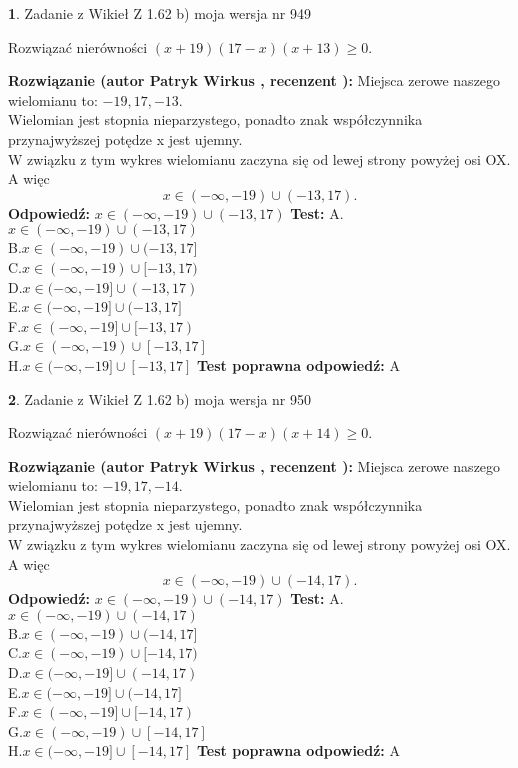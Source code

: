 \documentclass[12pt, a4paper]{article}
\theoremstyle{definition} %
\newtheorem{zad}{}
\newcommand{\zadStart}[1]{\begin{zad}#1\newline}
\newcommand{\zadStop}{\end{zad}}
\newcommand{\rozwStart}[2]{\noindent \textbf{Rozwiązanie (autor #1 , recenzent #2): }\newline}
\newcommand{\rozwStop}{\newline}
\newcommand{\odpStart}{\noindent \textbf{Odpowiedź:}\newline}
\newcommand{\odpStop}{\newline}
\newcommand{\testStart}{\noindent \textbf{Test:}\newline}
\newcommand{\testStop}{\newline}
\newcommand{\kluczStart}{\noindent \textbf{Test poprawna odpowiedź:}\newline}
\newcommand{\kluczStop}{\newline}
\begin{document}
\zadStart{Zadanie z Wikieł Z 1.62 b) moja wersja nr 949}

Rozwiązać nierówności $(x+19)(17-x)(x+13)\ge0$.
\zadStop
\rozwStart{Patryk Wirkus}{}
Miejsca zerowe naszego wielomianu to: $-19, 17, -13$.\\
Wielomian jest stopnia nieparzystego, ponadto znak współczynnika przy\linebreak najwyższej potędze x jest ujemny.\\ W związku z tym wykres wielomianu zaczyna się od lewej strony powyżej osi OX. A więc $$x \in (-\infty,-19) \cup (-13,17).$$
\rozwStop
\odpStart
$x \in (-\infty,-19) \cup (-13,17)$
\odpStop
\testStart
A.$x \in (-\infty,-19) \cup (-13,17)$\\
B.$x \in (-\infty,-19) \cup (-13,17]$\\
C.$x \in (-\infty,-19) \cup [-13,17)$\\
D.$x \in (-\infty,-19] \cup (-13,17)$\\
E.$x \in (-\infty,-19] \cup (-13,17]$\\
F.$x \in (-\infty,-19] \cup [-13,17)$\\
G.$x \in (-\infty,-19) \cup [-13,17]$\\
H.$x \in (-\infty,-19] \cup [-13,17]$
\testStop
\kluczStart
A
\kluczStop



\zadStart{Zadanie z Wikieł Z 1.62 b) moja wersja nr 950}

Rozwiązać nierówności $(x+19)(17-x)(x+14)\ge0$.
\zadStop
\rozwStart{Patryk Wirkus}{}
Miejsca zerowe naszego wielomianu to: $-19, 17, -14$.\\
Wielomian jest stopnia nieparzystego, ponadto znak współczynnika przy\linebreak najwyższej potędze x jest ujemny.\\ W związku z tym wykres wielomianu zaczyna się od lewej strony powyżej osi OX. A więc $$x \in (-\infty,-19) \cup (-14,17).$$
\rozwStop
\odpStart
$x \in (-\infty,-19) \cup (-14,17)$
\odpStop
\testStart
A.$x \in (-\infty,-19) \cup (-14,17)$\\
B.$x \in (-\infty,-19) \cup (-14,17]$\\
C.$x \in (-\infty,-19) \cup [-14,17)$\\
D.$x \in (-\infty,-19] \cup (-14,17)$\\
E.$x \in (-\infty,-19] \cup (-14,17]$\\
F.$x \in (-\infty,-19] \cup [-14,17)$\\
G.$x \in (-\infty,-19) \cup [-14,17]$\\
H.$x \in (-\infty,-19] \cup [-14,17]$
\testStop
\kluczStart
A
\kluczStop
\end{document}
